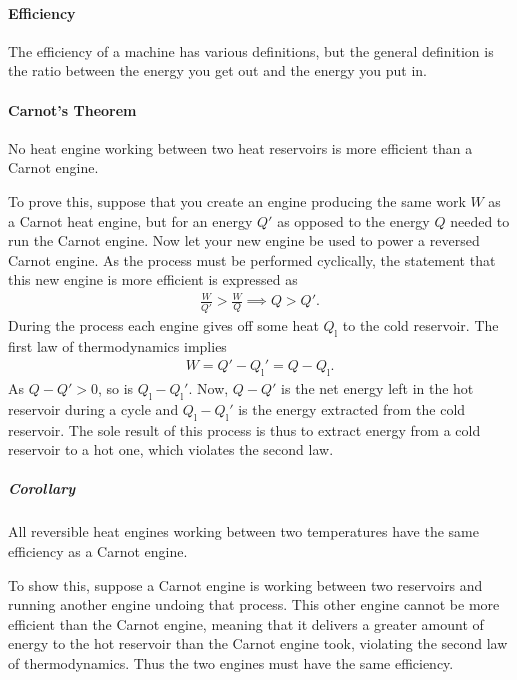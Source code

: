 \paragraph{Efficiency}
The efficiency of a machine has various definitions, but the general definition is the ratio between the energy you get out and the energy you put in.

\paragraph{Carnot's Theorem}
No heat engine working between two heat reservoirs is more efficient than a Carnot engine.

To prove this, suppose that you create an engine producing the same work $W$ as a Carnot heat engine, but for an energy $Q'$ as opposed to the energy $Q$ needed to run the Carnot engine. Now let your new engine be used to power a reversed Carnot engine. As the process must be performed cyclically, the statement that this new engine is more efficient is expressed as
\begin{align*}
	\frac{W}{Q'} > \frac{W}{Q} \implies Q > Q'.
\end{align*}
During the process each engine gives off some heat $Q_{\text{l}}$ to the cold reservoir. The first law of thermodynamics implies
\begin{align*}
	W = Q' - Q_{\text{l}}' = Q - Q_{\text{l}}.
\end{align*}
As $Q - Q' > 0$, so is $Q_{\text{l}} - Q_{\text{l}}'$. Now, $Q - Q'$ is the net energy left in the hot reservoir during a cycle and $Q_{\text{l}} - Q_{\text{l}}'$ is the energy extracted from the cold reservoir. The sole result of this process is thus to extract energy from a cold reservoir to a hot one, which violates the second law.

\subparagraph{Corollary}
All reversible heat engines working between two temperatures have the same efficiency as a Carnot engine.

To show this, suppose a Carnot engine is working between two reservoirs and running another engine undoing that process. This other engine cannot be more efficient than the Carnot engine, meaning that it delivers a greater amount of energy to the hot reservoir than the Carnot engine took, violating the second law of thermodynamics. Thus the two engines must have the same efficiency.

